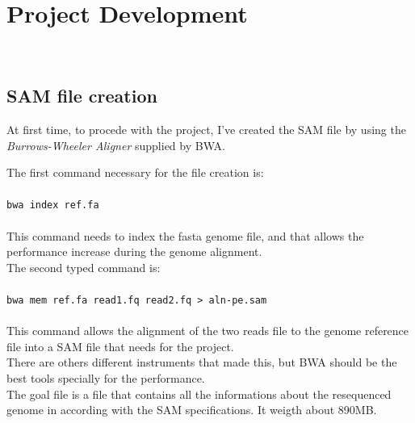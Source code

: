 
\chapter{Project Development}
\label{cap:project-development}

\\

\section{SAM file creation}
At first time, to procede with the project, I've created the SAM file by using the \emph{Burrows-Wheeler Aligner} supplied by BWA.

The first command necessary for the file creation is:
\\
\\
\verb|bwa index ref.fa|
\\
\\
This command needs to index the fasta genome file, and that allows the performance increase during the genome alignment.\\

The second typed command is:
\\
\\
\verb|bwa mem ref.fa read1.fq read2.fq > aln-pe.sam|
\\
\\
This command allows the alignment of the two reads file to the genome reference file into a SAM file that needs for the project.\\

There are others different instruments that made this, but BWA should be the best tools specially for the performance.\\

The goal file is a file that contains all the informations about the resequenced genome in according with the SAM specifications.
It weigth about 890MB.


